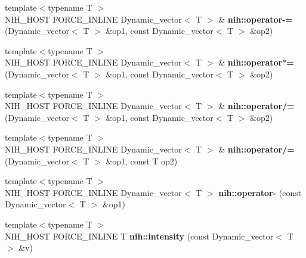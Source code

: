 \begin{DoxyCompactItemize}
\item 
\hypertarget{group__linalg_ga82cdc8251f47077b9f8c1039ef58cf49}{
{\footnotesize template$<$typename T $>$ }\\\-N\-I\-H\-\_\-\-H\-O\-S\-T \-F\-O\-R\-C\-E\-\_\-\-I\-N\-L\-I\-N\-E \*
\-Dynamic\-\_\-vector$<$ \-T $>$ \& {\bfseries nih\-::operator-\/=} (\-Dynamic\-\_\-vector$<$ \-T $>$ \&op1, const \-Dynamic\-\_\-vector$<$ \-T $>$ \&op2)}
\label{group__linalg_ga82cdc8251f47077b9f8c1039ef58cf49}

\item 
\hypertarget{group__linalg_gaed066074df6e2c212e0391c9ad7f3ab4}{
{\footnotesize template$<$typename T $>$ }\\\-N\-I\-H\-\_\-\-H\-O\-S\-T \-F\-O\-R\-C\-E\-\_\-\-I\-N\-L\-I\-N\-E \*
\-Dynamic\-\_\-vector$<$ \-T $>$ \& {\bfseries nih\-::operator$\ast$=} (\-Dynamic\-\_\-vector$<$ \-T $>$ \&op1, const \-Dynamic\-\_\-vector$<$ \-T $>$ \&op2)}
\label{group__linalg_gaed066074df6e2c212e0391c9ad7f3ab4}

\item 
\hypertarget{group__linalg_ga39a60ac993fe55bd154195143103db47}{
{\footnotesize template$<$typename T $>$ }\\\-N\-I\-H\-\_\-\-H\-O\-S\-T \-F\-O\-R\-C\-E\-\_\-\-I\-N\-L\-I\-N\-E \*
\-Dynamic\-\_\-vector$<$ \-T $>$ \& {\bfseries nih\-::operator/=} (\-Dynamic\-\_\-vector$<$ \-T $>$ \&op1, const \-Dynamic\-\_\-vector$<$ \-T $>$ \&op2)}
\label{group__linalg_ga39a60ac993fe55bd154195143103db47}

\item 
\hypertarget{group__linalg_gaea3d6db75903c3527b138f4f0fefca65}{
{\footnotesize template$<$typename T $>$ }\\\-N\-I\-H\-\_\-\-H\-O\-S\-T \-F\-O\-R\-C\-E\-\_\-\-I\-N\-L\-I\-N\-E \*
\-Dynamic\-\_\-vector$<$ \-T $>$ \& {\bfseries nih\-::operator/=} (\-Dynamic\-\_\-vector$<$ \-T $>$ \&op1, const \-T op2)}
\label{group__linalg_gaea3d6db75903c3527b138f4f0fefca65}

\item 
\hypertarget{group__linalg_ga95b070c73b1d688ad69d771bd8805c2a}{
{\footnotesize template$<$typename T $>$ }\\\-N\-I\-H\-\_\-\-H\-O\-S\-T \-F\-O\-R\-C\-E\-\_\-\-I\-N\-L\-I\-N\-E \*
\-Dynamic\-\_\-vector$<$ \-T $>$ {\bfseries nih\-::operator-\/} (const \-Dynamic\-\_\-vector$<$ \-T $>$ \&op1)}
\label{group__linalg_ga95b070c73b1d688ad69d771bd8805c2a}

\item 
\hypertarget{group__linalg_ga1e83c791b1d46a853b46036c61531ebe}{
{\footnotesize template$<$typename T $>$ }\\\-N\-I\-H\-\_\-\-H\-O\-S\-T \-F\-O\-R\-C\-E\-\_\-\-I\-N\-L\-I\-N\-E \-T {\bfseries nih\-::intensity} (const \-Dynamic\-\_\-vector$<$ \-T $>$ \&v)}
\label{group__linalg_ga1e83c791b1d46a853b46036c61531ebe}


\end{DoxyCompactItemize}
